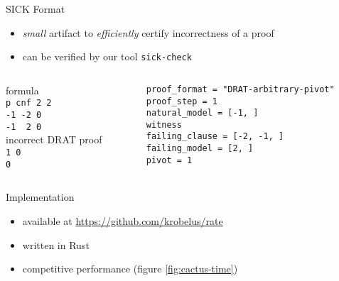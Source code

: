 \documentclass[final,hyperref={pdfpagelabels=true}]{beamer}
\begin{document}
\begin{frame}[fragile]
\begin{columns}[t]
    \begin{column}{.45\textwidth}
    \begin{block}{SICK Format}
        \begin{itemize}
            \item \emph{small} artifact to \emph{efficiently} certify
            incorrectness of a proof
            \item can be verified by our tool \texttt{sick-check}
        \end{itemize}
        \vspace{1cm}
        \begin{columns}[t]
            \begin{column}{.25\textwidth}
                formula\\
                \texttt{p cnf 2 2\\-1 -2 0\\ -1\ \ 2 0\\}
                incorrect DRAT proof\\
                \texttt{1 0\\0\\}
            \end{column}
            \begin{column}{.8\textwidth}
                \texttt{proof\_format = "DRAT-arbitrary-pivot"\\
proof\_step     = 1\\
natural\_model  = [-1, ]\\
\lbrack\lbrack{}witness\rbrack\rbrack{}\\
failing\_clause = [-2, -1, ]\\
failing\_model  = [2, ]\\
pivot          = 1\\
                }
            \end{column}
        \end{columns}
    \end{block}
    \begin{block}{Implementation}
        \begin{itemize}
            \item available at \url{https://github.com/krobelus/rate}
            \item written in Rust
            \item competitive performance (figure \ref{fig:cactus-time})
        \end{itemize}
    \end{block}


\end{column}
\end{columns}
\end{frame}
\end{document}
